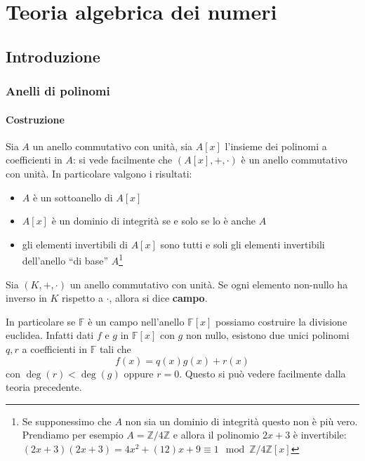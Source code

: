 \part{Teoria algebrica dei numeri}
\chapter{Introduzione}
\section{Anelli di polinomi}
\subsection{Costruzione}



\label{lezione14}
Sia $A$ un anello commutativo con unità, sia $A[x]$ l'insieme dei polinomi a coefficienti in $A$: si vede facilmente che $\left(A[x],+,\cdot\right)$ è un anello commutativo con unità. In particolare valgono i risultati:
\begin{itemize}
	\item $A$ è un sottoanello di $A[x]$
	\item $A[x]$ è un dominio di integrità se e solo se lo è anche $A$
	\item gli elementi invertibili di $A[x]$ sono tutti e soli gli elementi invertibili dell'anello \enquote{di base} $A$\footnote{Se supponessimo che $A$ non sia un dominio di integrità questo non è più vero. Prendiamo per esempio $A = \mathbb{Z}/4\mathbb{Z}$ e allora il polinomio $2x+3$ è invertibile: $(2x+3)(2x+3) = 4x^2 + (12)x + 9 \equiv 1 \mod \mathbb{Z}/4\mathbb{Z}\left[x\right]$}
\end{itemize}
\begin{definizione}[Campo]
	Sia $(K,+,\cdot)$ un anello commutativo con unità. Se ogni elemento non-nullo ha inverso in $K$ rispetto a $\cdot$, allora si dice \textbf{campo}.
\end{definizione}
\begin{osservazione}
	In particolare se $\mathbb{F}$ è un campo nell'anello $\mathbb{F}[x]$ possiamo costruire la divisione euclidea. Infatti dati $f$ e $g$ in $\mathbb{F}[x]$ con $g$ non nullo, esistono due unici polinomi $q,r$ a coefficienti in $\mathbb{F}$ tali che 
	\begin{equation*}
	f(x)=q(x)g(x)+r(x)
	\end{equation*}
	con $\deg(r)<\deg(g)$ oppure $r=0$. Questo si può vedere facilmente dalla teoria precedente.
\end{osservazione}
